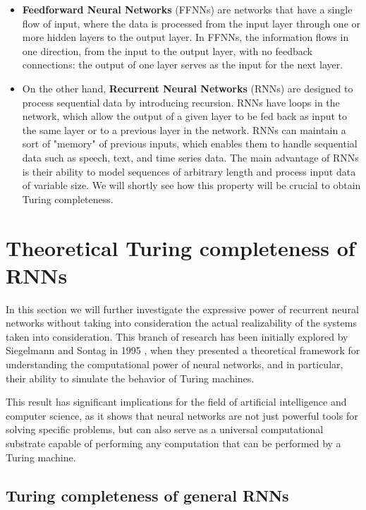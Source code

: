 \documentclass{article}
\begin{document}
\begin{itemize}
    \item \textbf{Feedforward Neural Networks} (FFNNs) are networks that have a single flow of input, where the data is processed from the input layer through one or more hidden layers to the output layer. In FFNNs, the information flows in one direction, from the input to the output layer, with no feedback connections: the output of one layer serves as the input for the next layer.

    \item On the other hand, \textbf{Recurrent Neural Networks} (RNNs) are designed to process sequential data by introducing recursion. RNNs have loops in the network, which allow the output of a given layer to be fed back as input to the same layer or to a previous layer in the network. RNNs can maintain a sort of "memory" of previous inputs, which enables them to handle sequential data such as speech, text, and time series data. The main advantage of RNNs is their ability to model sequences of arbitrary length and process input data of variable size. We will shortly see how this property will be crucial to obtain Turing completeness.
\end{itemize}

\section{Theoretical Turing completeness of RNNs}\label{sec:theoretical}

In this section we will further investigate the expressive power of recurrent neural networks without taking into consideration the actual realizability of the systems taken into consideration. This branch of research has been initially explored by Siegelmann and Sontag in 1995 \cite{SIE95}, when they presented a theoretical framework for understanding the computational power of neural networks, and in particular, their ability to simulate the behavior of Turing machines.

This result has significant implications for the field of artificial intelligence and computer science, as it shows that neural networks are not just powerful tools for solving specific problems, but can also serve as a universal computational substrate capable of performing any computation that can be performed by a Turing machine.

\subsection{Turing completeness of general RNNs}
\end{document}
